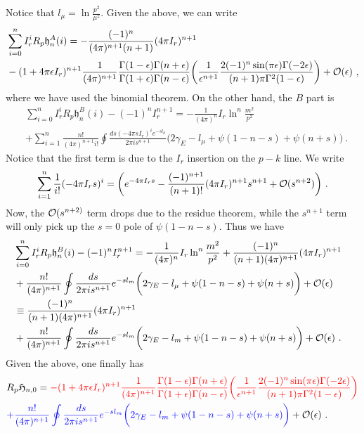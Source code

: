\documentclass[a4paper,11pt]{article}
\begin{document}
Notice that $l_{\mu}=\ln \frac{p^2}{\mu^2}$. 
Given the above, we can write 
\begin{align}
&\sum_{i=0}^nI_r^iR_p\mathfrak{h}^A_n(i)=-\frac{(-1)^n}{(4\pi)^{n+1}(n+1)}(4\pi  I_r)^{n+1} \nonumber \\ 
&-(1+4\pi \epsilon I_r)^{n+1}\frac{1}{(4\pi)^{n+1}}\frac{\Gamma(1-\epsilon)\Gamma(n+\epsilon)}{\Gamma(1+\epsilon)\Gamma(n-\epsilon)}\bigg(\frac{1}{\epsilon^{n+1}}\frac{2 (-1)^{n}  \sin (\pi  \epsilon) \Gamma (-2 \epsilon)}{(n+1)\pi \Gamma^2 (1-\epsilon)}\bigg) +{\cal O}(\epsilon) \ ,
\end{align}
where we have used the binomial theorem. 
On the other hand, the $B$ part is
\begin{align}
&\sum_{i=0}^nI_r^iR_p\mathfrak{h}^B_n(i)-(-1)^nI_r^{n+1}=-\frac{1}{(4\pi)^{n}}I_r \ln^n\frac{m^2}{p^2}\nonumber \\ 
&+\sum_{i=1}^n\frac{n!}{(4\pi)^{n+1} i!}\oint\frac{ds (-4\pi sI_r)^ie^{-sl_{\mu}}}{2\pi i s^{n+1}}\bigg(2\gamma_E-l_{\mu}+\psi(1-n-s)+\psi(n+s)\bigg) \ .
\end{align}
Notice that the first term is due to the $I_r$ insertion on the $p-k$ line. We write
\begin{align}
\sum_{i=1}^n\frac{1}{i!}(-4\pi I_r s)^i=\bigg(e^{-4\pi I_rs}-\frac{(-1)^{n+1}}{(n+1)!}(4\pi I_r)^{n+1} s^{n+1}+{\cal O}(s^{n+2})\bigg) \ .
\end{align}
Now, the ${\cal O}(s^{n+2)}$ term drops due to the residue theorem, while the $s^{n+1}$ term will only pick up the $s=0$ pole of $\psi(1-n-s)$. Thus we have
\begin{align}
&\sum_{i=0}^nI_r^iR_p\mathfrak{h}^B_n(i)-(-1)^nI_r^{n+1}=-\frac{1}{(4\pi)^{n}}I_r \ln^n\frac{m^2}{p^2} +\frac{(-1)^n}{(n+1)(4\pi)^{n+1}}(4\pi I_r)^{n+1} \nonumber \\ 
&+\frac{n!}{(4\pi)^{n+1}}\oint\frac{ds }{2\pi i s^{n+1}}e^{-sl_{m}}\bigg(2\gamma_E-l_{\mu}+\psi(1-n-s)+\psi(n+s)\bigg) +{\cal O}(\epsilon) 
&\nonumber \\ 
&\equiv\frac{(-1)^n}{(n+1)(4\pi)^{n+1}}(4\pi I_r)^{n+1}\nonumber \\ 
&+\frac{n!}{(4\pi)^{n+1}}\oint\frac{ds }{2\pi i s^{n+1}}e^{-sl_{m}}\bigg(2\gamma_E-l_{m}+\psi(1-n-s)+\psi(n+s)\bigg) +{\cal O}(\epsilon)  \ .
\end{align}
Given the above, one finally has
\begin{align}
&R_p\mathfrak{H}_{n,0}={\color{red}-(1+4\pi \epsilon I_r)^{n+1}\frac{1}{(4\pi)^{n+1}}\frac{\Gamma(1-\epsilon)\Gamma(n+\epsilon)}{\Gamma(1+\epsilon)\Gamma(n-\epsilon)}\bigg(\frac{1}{\epsilon^{n+1}}\frac{2 (-1)^{n}  \sin (\pi  \epsilon) \Gamma (-2 \epsilon)}{(n+1)\pi \Gamma^2 (1-\epsilon)}\bigg)} \nonumber \\ 
&{\color{blue}+\frac{n!}{(4\pi)^{n+1}}\oint\frac{ds }{2\pi i s^{n+1}}e^{-sl_{m}}\bigg(2\gamma_E-l_{m}+\psi(1-n-s)+\psi(n+s)\bigg) }+{\cal O}(\epsilon) \ . \label{eq:cnall}
\end{align}
\end{document}
